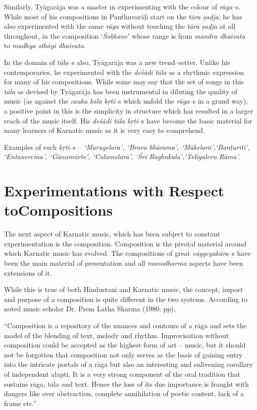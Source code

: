 Similarly, Tyāgarāja was a master in experimenting with the colour of \textit{rāga}–s. While most of his compositions in Panthuvarāḷi start on the \textit{tāra ṣaḍja}, he has also experimented with the same \textit{rāga} without touching the \textit{tāra ṣaḍja} at all throughout, in the composition ‘\textit{Śobhāne}’ whose range is from \textit{mandra dhaivata} to \textit{madhya sthāyi dhaivata}.

In the domain of \textit{tāla}–s also, Tyāgarāja was a new trend–setter. Unlike his contemporaries, he experimented with the \textit{deśādi tāla} as a rhythmic expression for many of his compositions. While some may say that the set of songs in this \textit{tāla} as devised by Tyāgarāja has been instrumental in diluting the quality of music (as against the \textit{cauka kāla kṛti}–s which unfold the \textit{rāga}–s in a grand way), a positive point in this is the simplicity in structure which has resulted in a larger reach of the music itself. His \textit{deśādi tāla kṛti}–s have become the basic material for many learners of Karnatic music as it is very easy to comprehend.

Examples of such \textit{kṛti}–s – \textit{‘Marugelara’, ‘Brova bhārama’, ‘Mākelarā’,\break ‘Banṭurīti’, ‘Entanercina’, ‘Gānamūrte’, ‘Calamelarā’, ‘Śrī Raghukula’,\break ‘Teliyaleru Rāma’}.


\section*{Experimentations with Respect to\hfill \break Compositions}

The next aspect of Karnatic music, which has been subject to constant experimentation is the composition. Composition is the pivotal material around which Karnatic music has evolved. The compositions of great \textit{vāggeyakāra}–s have been the main material of presentation and all \textit{manodharma} aspects have been extensions of it.

While this is true of both Hindustani and Karnatic music, the concept, import and purpose of a composition is quite different in the two systems. According to noted music scholar Dr. Prem Latha Sharma (1980: pp),

\begin{myquote}
“Composition is a repository of the nuances and contours of a rāga and sets the model of the blending of text, melody and rhythm. Improvisation without composition could be accepted as the highest form of art – music, but it should not be forgotten that composition not only serves as the basis of gaining entry into the intricate portals of a rāga but also an interesting and enlivening corollary of independent alapti. It is a very strong component of the oral tradition that sustains rāga, tāla and text. Hence the loss of its due importance is fraught with dangers like over abstraction, complete annihilation of poetic content, lack of a frame etc.”
\end{myquote}

